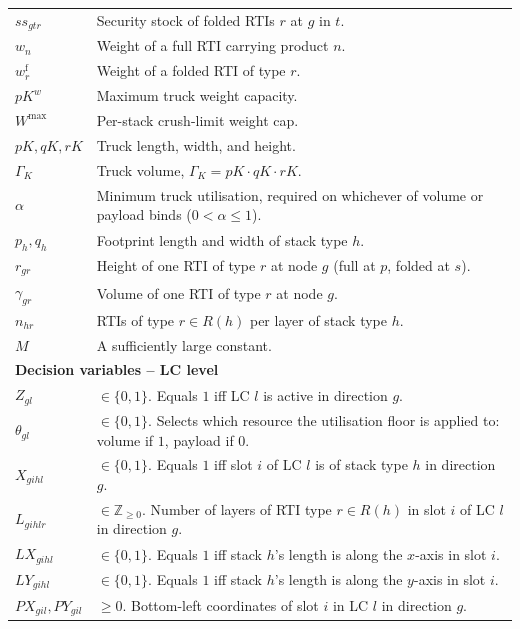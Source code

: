 \begin{longtable}[hbt!]{|p{}|p{}|}
    $ss_{gtr}$     & Security stock of folded RTIs $r$ at $g$ in $t$.\\
    $w_{n}$        & Weight of a full RTI carrying product $n$.\\
    $w^{\mathrm{f}}_{r}$ & Weight of a folded RTI of type $r$.\\
    $pK^{w}$       & Maximum truck weight capacity.\\
    $W^{\max}$     & Per-stack crush-limit weight cap.\\
    $pK,qK,rK$     & Truck length, width, and height.\\
    $\Gamma_K$     & Truck volume, $\Gamma_K=pK\cdot qK\cdot rK$.\\
    $\alpha$       & Minimum truck utilisation, required on whichever of volume or payload binds ($0<\alpha\le 1$).\\
    $p_{h},q_{h}$  & Footprint length and width of stack type $h$.\\
    $r_{gr}$       & Height of one RTI of type $r$ at node $g$ (full at $p$, folded at $s$).\\
    $\gamma_{gr}$  & Volume of one RTI of type $r$ at node $g$.\\
    $n_{hr}$       & RTIs of type $r\in R(h)$ per layer of stack type $h$.\\
    $M$            & A sufficiently large constant.\\
    \hline
    \multicolumn{2}{|l|}{\textbf{Decision variables -- LC level}}\\\hline
    $Z_{gl}$         & $\in\{0,1\}$. Equals $1$ iff LC $l$ is active in direction $g$.\\
    $\theta_{gl}$    & $\in\{0,1\}$. Selects which resource the utilisation floor is applied to: volume if $1$, payload if $0$.\\
    $X_{gihl}$       & $\in\{0,1\}$. Equals $1$ iff slot $i$ of LC $l$ is of stack type $h$ in direction $g$.\\
    $L_{gihlr}$      & $\in\mathbb{Z}_{\ge 0}$. Number of layers of RTI type $r\in R(h)$ in slot $i$ of LC $l$ in direction $g$.\\
    $LX_{gihl}$      & $\in\{0,1\}$. Equals $1$ iff stack $h$'s length is along the $x$-axis in slot $i$.\\
    $LY_{gihl}$      & $\in\{0,1\}$. Equals $1$ iff stack $h$'s length is along the $y$-axis in slot $i$.\\
    $PX_{gil},PY_{gil}$ & $\ge 0$. Bottom-left coordinates of slot $i$ in LC $l$ in direction $g$.\\

\end{longtable}
